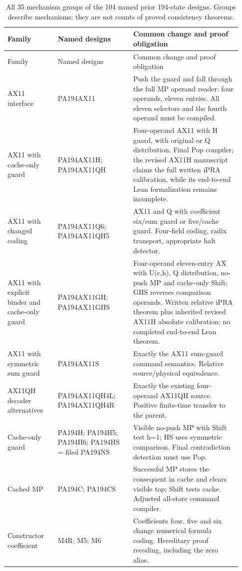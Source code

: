 \begingroup
\small
\setlength{\tabcolsep}{3pt}
\begin{longtable}{p{0.20\linewidth}p{0.30\linewidth}p{0.43\linewidth}}
\caption{All 35 mechanism groups of the 104 named prior 194-state designs. Groups describe mechanisms; they are not counts of proved consistency theorems.}\\
\toprule Family & Named designs & Common change and proof obligation\\\midrule\endfirsthead
\toprule Family & Named designs & Common change and proof obligation\\\midrule\endhead
\bottomrule\endfoot
AX11 interface & PA194AX11 & Push the guard and fall through the full MP operand reader: four operands, eleven entries. All eleven selectors and the fourth operand must be compiled.\\[4pt]
AX11 with cache-only guard & PA194AX11H; PA194AX11QH & Four-operand AX11 with H guard, with original or Q distribution. Final Pop compiler; the revised AX11H manuscript claims the full written iPRA calibration, while its end-to-end Lean formalization remains incomplete.\\[4pt]
AX11 with changed coding & PA194AX11Q6; PA194AX11QH5 & AX11 and Q with coefficient six/sum guard or five/cache guard. Four-field coding, radix transport, appropriate halt detector.\\[4pt]
AX11 with explicit binder and cache-only guard & PA194AX11GH; PA194AX11GHS & Four-operand eleven-entry AX with U(c,h), Q distribution, no-push MP and cache-only Shift; GHS reverses comparison operands. Written relative iPRA theorem plus inherited revised AX11H absolute calibration; no completed end-to-end Lean theorem.\\[4pt]
AX11 with symmetric sum guard & PA194AX11S & Exactly the AX11 sum-guard command semantics. Relative source/physical equivalence.\\[4pt]
AX11QH decoder alternatives & PA194AX11QH4L; PA194AX11QH4R & Exactly the existing four-operand AX11QH source. Positive finite-time transfer to the parent.\\[4pt]
Cache-only guard & PA194H; PA194H5; PA194H6; PA194HS = filed PA194NS & Visible no-push MP with Shift test h=1; HS uses symmetric comparison. Final contradiction detection must use Pop.\\[4pt]
Cached MP & PA194C; PA194CS & Successful MP stores the consequent in cache and clears visible top; Shift tests cache. Adjusted all-store command compiler.\\[4pt]
Constructor coefficient & M4R; M5; M6 & Coefficients four, five and six change numerical formula coding. Hereditary proof recoding, including the zero alias.\\[4pt]

\end{longtable}
